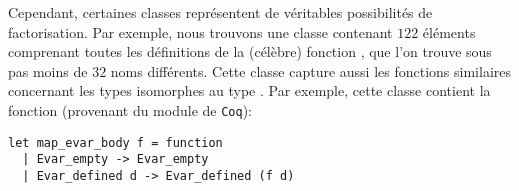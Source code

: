 Cependant, certaines classes représentent de véritables possibilités de factorisation. Par exemple, nous trouvons une classe contenant $122$ éléments comprenant toutes les définitions de la (célèbre) fonction , que l'on trouve sous pas moins de $32$ noms différents. Cette classe capture aussi les fonctions similaires concernant les types isomorphes au type . Par exemple, cette classe contient la fonction  (provenant du module  de \verb|Coq|):

\begin{verbatim}
let map_evar_body f = function
  | Evar_empty -> Evar_empty
  | Evar_defined d -> Evar_defined (f d)
\end{verbatim}
